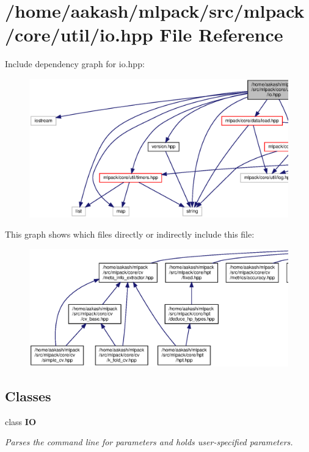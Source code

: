 \section{/home/aakash/mlpack/src/mlpack/core/util/io.hpp File Reference}
\label{io_8hpp}
Include dependency graph for io.\+hpp\+:
\nopagebreak
\begin{figure}[H]
\begin{center}
\leavevmode
\includegraphics[width=350pt]{io_8hpp__incl}
\end{center}
\end{figure}
This graph shows which files directly or indirectly include this file\+:
\nopagebreak
\begin{figure}[H]
\begin{center}
\leavevmode
\includegraphics[width=350pt]{io_8hpp__dep__incl}
\end{center}
\end{figure}
\subsection*{Classes}
\begin{DoxyCompactItemize}
\item 
class \textbf{ IO}
\begin{DoxyCompactList}\small\item\em Parses the command line for parameters and holds user-\/specified parameters. \end{DoxyCompactList}\end{DoxyCompactItemize}
